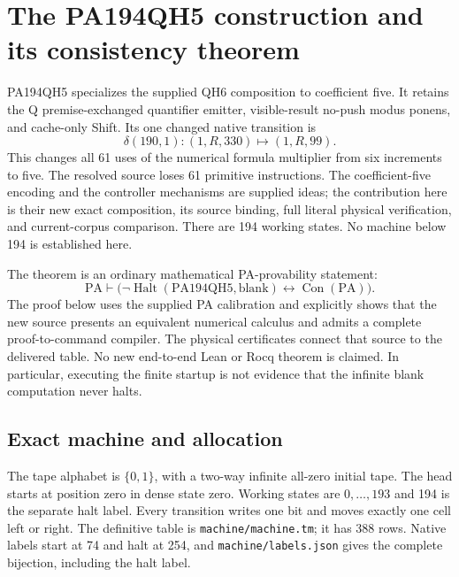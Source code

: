 \section{The PA194QH5 construction and its consistency theorem}
\label{sec:qh5-preservation}

PA194QH5 specializes the supplied QH6 composition to coefficient five.
It retains the Q premise-exchanged quantifier emitter, visible-result
no-push modus ponens, and cache-only Shift. Its one changed native transition is
\[
 \delta(190,1):(1,R,330)\longmapsto(1,R,99).
\]
This changes all 61 uses of the numerical formula multiplier from six
increments to five. The resolved source loses 61 primitive instructions.
The coefficient-five encoding and the controller mechanisms are supplied
ideas; the contribution here is their new exact composition, its source
binding, full literal physical verification, and current-corpus comparison.
There are 194 working states. No machine below 194 is established here.

The theorem is an ordinary mathematical PA-provability statement:
\[
 \mathrm{PA}\vdash
 \bigl(\neg\operatorname{Halt}(\mathrm{PA194QH5},\mathrm{blank})
       \leftrightarrow\operatorname{Con}(\mathrm{PA})\bigr).
 \tag{QH5}
\]
The proof below uses the supplied PA calibration and explicitly shows that
the new source presents an equivalent numerical calculus and admits a
complete proof-to-command compiler. The physical certificates connect that
source to the delivered table. No new end-to-end Lean or Rocq theorem is
claimed. In particular, executing the finite startup is not evidence that
the infinite blank computation never halts.

\subsection{Exact machine and allocation}

The tape alphabet is $\{0,1\}$, with a two-way infinite all-zero initial
tape. The head starts at position zero in dense state zero. Working states
are $0,\ldots,193$ and 194 is the separate halt label. Every transition
writes one bit and moves exactly one cell left or right. The definitive
table is \texttt{machine/machine.tm}; it has 388 rows. Native labels start
at 74 and halt at 254, and \texttt{machine/labels.json} gives the complete
bijection, including the halt label.

